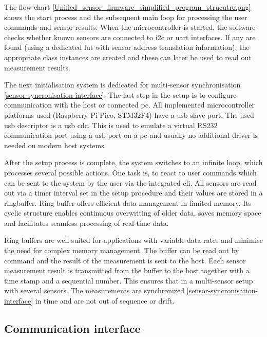 The flow chart
\ref{Unified_sensor_firmware_simplified_program_strucutre.png} shows the
start process and the subsequent main loop for processing the user
commands and sensor results. When the microcontroller is started, the
software checks whether known sensors are connected to \gls{i2c} or
\gls{uart} interfaces. If any are found (using a dedicated \gls{lut}
with sensor address translation information), the appropriate class
instances are created and these can later be used to read out
measurement results.

The next initialisation system is dedicated for multi-sensor
synchronisation \ref{sensor-syncronisation-interface}. The last step in
the setup is to configure communication with the host or connected
\gls{pc}. All implemented microcontroller platforms used (Raspberry Pi
Pico, STM32F4) have a \gls{usb} slave port. The used usb descriptor is a
\gls{usb} \gls{cdc}. This is used to emulate a virtual RS232
communication port using a \gls{usb} port on a \gls{pc} and usually no
additional driver is needed on modern host systems.

After the setup process is complete, the system switches to an infinite
loop, which processes several possible actions. One task is, to react to
user commands which can be sent to the system by the user via the
integrated \gls{cli}. All sensors are read out via a timer interval set
in the setup procedure and their values are stored in a ringbuffer. Ring
buffer offers efficient data management in limited memory. Its cyclic
structure enables continuous overwriting of older data, saves memory
space and facilitates seamless processing of real-time data.

Ring buffers are well suited for applications with variable data rates
and minimise the need for complex memory management. The buffer can be
read out by command and the result of the measurement is sent to the
host. Each sensor measurement result is transmitted from the buffer to
the host together with a time stamp and a sequential number. This
ensures that in a multi-sensor setup with several sensors. The
measurements are synchronized \ref{sensor-syncronisation-interface} in
time and are not out of sequence or drift.

\hypertarget{communication-interface}{%
\subsection{Communication interface}\label{communication-interface}}

